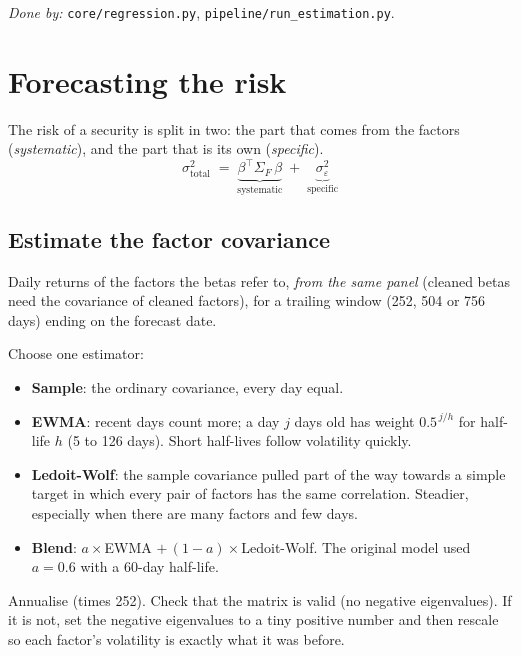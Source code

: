 \documentclass[11pt,a4paper]{article}
\newcommand{\doneby}[1]{\par{\raggedright\small\textit{Done by:} #1\par}}
\begin{document}
\doneby{\texttt{core/regression.py}, \texttt{pipeline/run\_estimation.py}.}

\section{Forecasting the risk}\label{part:risk}

The risk of a security is split in two: the part that comes from the factors
(\emph{systematic}), and the part that is its own (\emph{specific}).
\[
  \sigma^2_{\text{total}} \;=\; \underbrace{\beta^{\top}\Sigma_F\,\beta}_{\text{systematic}}
  \;+\; \underbrace{\sigma^2_{\varepsilon}}_{\text{specific}}
\]

\subsection{Estimate the factor covariance}

\begin{ingredients}
Daily returns of the factors the betas refer to, \emph{from the same panel}
(cleaned betas need the covariance of cleaned factors), for a trailing window
(252, 504 or 756 days) ending on the forecast date.
\end{ingredients}

\begin{method}
Choose one estimator:
\begin{itemize}[leftmargin=1.2em]
  \item \textbf{Sample}: the ordinary covariance, every day equal.
  \item \textbf{EWMA}: recent days count more; a day $j$ days old has weight $0.5^{\,j/h}$ for half-life $h$ (5 to 126 days). Short half-lives follow volatility quickly.
  \item \textbf{Ledoit-Wolf}: the sample covariance pulled part of the way towards a simple target in which every pair of factors has the same correlation. Steadier, especially when there are many factors and few days.
  \item \textbf{Blend}: $a\times$EWMA $+\,(1-a)\times$Ledoit-Wolf. The original model used $a = 0.6$ with a 60-day half-life.
\end{itemize}
Annualise (times 252). Check that the matrix is valid (no negative eigenvalues). If
it is not, set the negative eigenvalues to a tiny positive number and then rescale so
each factor's volatility is exactly what it was before.
\end{method}
\end{document}

